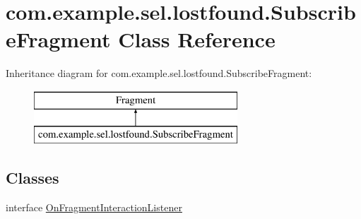 \hypertarget{classcom_1_1example_1_1sel_1_1lostfound_1_1SubscribeFragment}{\section{com.\-example.\-sel.\-lostfound.\-Subscribe\-Fragment Class Reference}
\label{classcom_1_1example_1_1sel_1_1lostfound_1_1SubscribeFragment}
}
Inheritance diagram for com.\-example.\-sel.\-lostfound.\-Subscribe\-Fragment\-:\begin{figure}[H]
\begin{center}
\leavevmode
\includegraphics[height=2.000000cm]{classcom_1_1example_1_1sel_1_1lostfound_1_1SubscribeFragment}
\end{center}
\end{figure}
\subsection*{Classes}
\begin{DoxyCompactItemize}
\item 
interface \hyperlink{interfacecom_1_1example_1_1sel_1_1lostfound_1_1SubscribeFragment_1_1OnFragmentInteractionListener}{On\-Fragment\-Interaction\-Listener}
\end{DoxyCompactItemize}
